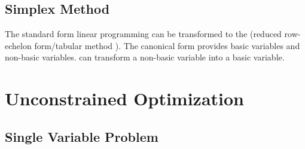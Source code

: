 \documentclass[12pt]{report}
\begin{document}
\subsection{Simplex Method}
The standard form linear programming can be transformed to the  (reduced row-echelon form/tabular method
). The canonical form provides basic variables and non-basic variables.  can transform a non-basic variable
into a basic variable.

\clearpage
\section{Unconstrained Optimization}

\subsection{Single Variable Problem}
\end{document}
